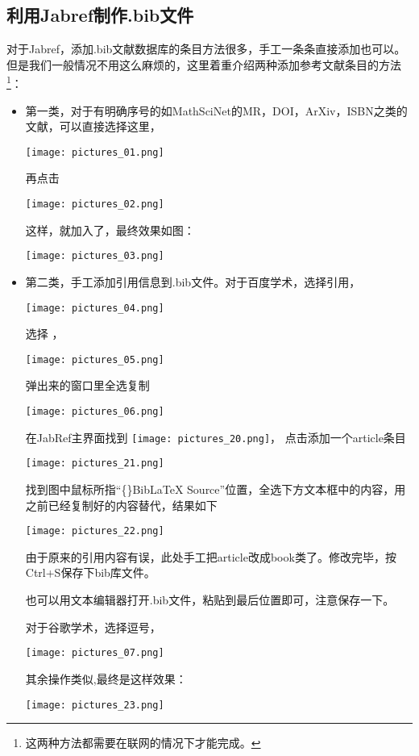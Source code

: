 \documentclass[cn,geye,cyan,normal,14pt]{elegantnote}
\begin{document}
\subsection{利用Jabref制作.bib文件}
	对于Jabref，添加.bib文献数据库的条目方法很多，手工一条条直接添加也可以。但是我们一般情况不用这么麻烦的，这里着重介绍两种添加参考文献条目的方法\footnote{这两种方法都需要在联网的情况下才能完成。}：
	\begin{itemize}
		\item 第一类，对于有明确序号的如MathSciNet的MR，DOI，ArXiv，ISBN之类的文献，可以直接选择这里，
			\begin{center}
				\texttt{[image: pictures\_01.png]}
			\end{center}
			再点击
			\begin{center}
				\texttt{[image: pictures\_02.png]}
			\end{center}
			这样，就加入了，最终效果如图：
			\begin{center}
			\texttt{[image: pictures\_03.png]}
			\end{center}
		\item 第二类，手工添加引用信息到.bib文件。对于百度学术，选择引用，
			\begin{center}
			\texttt{[image: pictures\_04.png]}
			\end{center}
			选择 \BibTeX，
			\begin{center}
			\texttt{[image: pictures\_05.png]}
			\end{center}
			弹出来的窗口里全选复制
			\begin{center}
			\texttt{[image: pictures\_06.png]}
			\end{center}
			在JabRef主界面找到
			\texttt{[image: pictures\_20.png]}，
			点击添加一个article条目
			\begin{center}
			\texttt{[image: pictures\_21.png]}
			\end{center}
			找到图中鼠标所指``\{\}Bib\LaTeX{} Source''位置，全选下方文本框中的内容，用之前已经复制好的内容替代，结果如下
			\begin{center}
			\texttt{[image: pictures\_22.png]}
			\end{center}
			由于原来的引用内容有误，此处手工把article改成book类了。修改完毕，按Ctrl+S保存下bib库文件。
			\begin{note}
			也可以用文本编辑器打开.bib文件，粘贴到最后位置即可，注意保存一下。\\
			\end{note}
对于谷歌学术，选择逗号，
			\begin{center}
			\texttt{[image: pictures\_07.png]}
			\end{center}
			其余操作类似,最终是这样效果：
			\begin{center}
			\texttt{[image: pictures\_23.png]}
			\end{center}
	\end{itemize}
\end{document}
